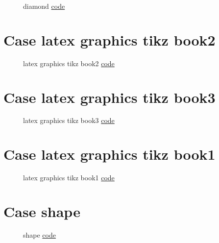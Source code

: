\documentclass{article}
\begin{document}
\begin{figure}[H]
    \centering
    
    \caption{diamond \href{https:/github.com/cauliyang/learn_tikz/blob/main/source/diamond.tex}{code} }
    \label{fig:diamond}
\end{figure}
    
\section{Case latex graphics tikz book2}

\begin{figure}[H]
    \centering
    
    \caption{latex graphics tikz book2 \href{https:/github.com/cauliyang/learn_tikz/blob/main/source/latex_graphics_tikz_book2.tex}{code} }
    \label{fig:latex graphics tikz book2}
\end{figure}
    
\section{Case latex graphics tikz book3}

\begin{figure}[H]
    \centering
    
    \caption{latex graphics tikz book3 \href{https:/github.com/cauliyang/learn_tikz/blob/main/source/latex_graphics_tikz_book3.tex}{code} }
    \label{fig:latex graphics tikz book3}
\end{figure}
    
\section{Case latex graphics tikz book1}

\begin{figure}[H]
    \centering
    
    \caption{latex graphics tikz book1 \href{https:/github.com/cauliyang/learn_tikz/blob/main/source/latex_graphics_tikz_book1.tex}{code} }
    \label{fig:latex graphics tikz book1}
\end{figure}
    
\section{Case shape}

\begin{figure}[H]
    \centering
    
    \caption{shape \href{https:/github.com/cauliyang/learn_tikz/blob/main/source/shape.tex}{code} }
    \label{fig:shape}
\end{figure}
    
\end{document}

